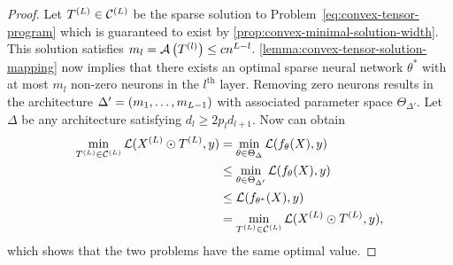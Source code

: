 \deepConvexReformulation*
\begin{proof}
    Let \( T^{(L)} \in \mathcal{C}^{(L)} \) be the sparse solution to
    Problem~\ref{eq:convex-tensor-program}
    which is guaranteed to exist by \cref{prop:convex-minimal-solution-width}.
    This solution satisfies \( m_l = \mathcal{A}\left(T^{(l)}\right) \leq c n^{L - l} \).
    \cref{lemma:convex-tensor-solution-mapping} now implies that there
    exists an optimal sparse neural network \( \theta^* \) with at
    most \( m_l \) non-zero neurons in the \( l^{\text{th}} \) layer.
    Removing zero neurons results in the architecture
    \( \Delta' = \left(m_1, \ldots, m_{L-1}\right) \)
    with associated parameter space \( \Theta_{\Delta'} \).
    Let \( \Delta \) be any architecture satisfying
    \( d_l \geq 2 p_l d_{l+1} \).
    Now can obtain
    \begin{align*}
        \min_{T^{(L)} \in \mathcal{C}^{(L)}} \mathcal{L}(X^{(L)} \odot T^{(L)}, y)
         & = \min_{\theta \in \Theta_{\Delta}} \mathcal{L}(f_\theta(X), y)     \\
         & \leq \min_{\theta \in \Theta_{\Delta'}} \mathcal{L}(f_\theta(X), y) \\
         & \leq \mathcal{L}(f_{\theta^*}(X), y)                                \\
         & = \min_{T^{(L)} \in \mathcal{C}^{(L)}} \mathcal{L}(X^{(L)} \odot T^{(L)}, y),
    \end{align*}
    which shows that the two problems have the same optimal value.
\end{proof}


